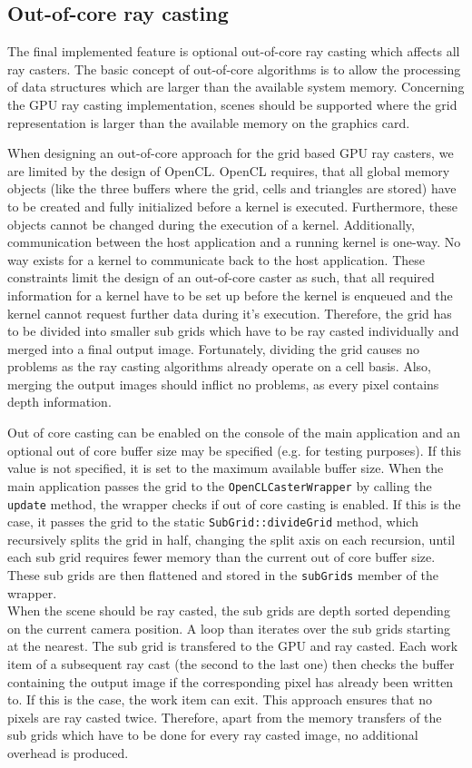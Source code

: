 \subsection{Out-of-core ray casting}
\label{sec:out_of_core}

The final implemented feature is optional out-of-core ray casting which affects all ray casters. The basic concept of out-of-core algorithms is to allow the processing of data structures which are larger than the available system memory. Concerning the GPU ray casting implementation, scenes should be supported where the grid representation is larger than the available memory on the graphics card.

When designing an out-of-core approach for the grid based GPU ray casters, we are limited by the design of OpenCL. OpenCL requires, that all global memory objects (like the three buffers where the grid, cells and triangles are stored) have to be created and fully initialized before a kernel is executed. Furthermore, these objects cannot be changed during the execution of a kernel. Additionally, communication between the host application and a running kernel is one-way. No way exists for a kernel to communicate back to the host application. These constraints limit the design of an out-of-core caster as such, that all required information for a kernel have to be set up before the kernel is enqueued and the kernel cannot request further data during it's execution. Therefore, the grid has to be divided into smaller sub grids which have to be ray casted individually and merged into a final output image. Fortunately, dividing the grid causes no problems as the ray casting algorithms already operate on a cell basis. Also, merging the output images should inflict no problems, as every pixel contains depth information.

Out of core casting can be enabled on the console of the main application and an optional out of core buffer size may be specified (e.g. for testing purposes). If this value is not specified, it is set to the maximum available buffer size. When the main application passes the grid to the \lstinline!OpenCLCasterWrapper!  by calling the \lstinline!update! method, the wrapper checks if out of core casting is enabled. If this is the case, it passes the grid to the static \lstinline!SubGrid::divideGrid! method, which recursively splits the grid in half, changing the split axis on each recursion, until each sub grid requires fewer memory than the current out of core buffer size. These sub grids are then flattened and stored in the \lstinline!subGrids! member of the wrapper. \\
When the scene should be ray casted, the sub grids are depth sorted depending on the current camera position. A loop than iterates over the sub grids starting at the nearest. The sub grid is transfered to the GPU and ray casted. Each work item of a subsequent ray cast (the second to the last one) then checks the buffer containing the output image if the corresponding pixel has already been written to. If this is the case, the work item can exit. This approach ensures that no pixels are ray casted twice. Therefore, apart from the memory transfers of the sub grids which have to be done for every ray casted image, no additional overhead is produced. 
